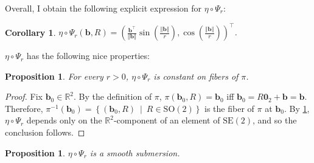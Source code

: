 \documentclass[a4paper,11pt]{scrartcl}
\newcounter{dummy}
\numberwithin{dummy}{section}
\theoremstyle{plain}
\newtheorem{proposition}[dummy]{Proposition}
\theoremstyle{plain}
\theoremstyle{plain}
\theoremstyle{plain}
\newtheorem{corollary}[dummy]{Corollary}
\theoremstyle{nonumberplain}
\newtheorem{proof}{Proof}
\newcommand{\F}[1][R]{\mathbb{#1}} %
\newcommand{\setsep}{\ \middle|\ } %
\newcommand{\Ltwonorm}[1]{\left\Vert #1 \right\Vert} %
\newcommand{\SE}{\mathrm{SE}}
\newcommand{\SO}{\mathrm{SO}}
\begin{document}
	Overall, I obtain the following explicit expression for $ \eta \circ \Psi_{r} $:
	\begin{corollary}
		\label{etaCompPsiFormula}
		$ \eta \circ \Psi_{r} \left(\mathbf{b}, R\right) 
		= \left( \frac{\mathbf{b}^{\top}}{\Ltwonorm{\mathbf{b}}} \sin \left(\frac{\Ltwonorm{\mathbf{b}}}{r}\right), \cos \left(\frac{\Ltwonorm{\mathbf{b}}}{r}\right) \right)^{\top} $.
	\end{corollary}
	
	$ \eta \circ \Psi_{r} $ has the following nice properties:
	\begin{proposition}
		\label{ConstantOnFibers}
		For every $ r > 0 $, $ \eta \circ \Psi_{r} $ is constant on fibers of $ \pi $.
	\end{proposition}
	
	\begin{proof}
		Fix $ \mathbf{b}_{0} \in \F^{2} $. By the definition of $ \pi $, $ \pi (\mathbf{b}_{0}, R) = \mathbf{b}_{0} $ iff $ \mathbf{b}_{0} = R \mathbf{0}_{2} + \mathbf{b} = \mathbf{b} $. Therefore, $ \pi^{-1} (\mathbf{b}_{0}) = \left\{ \left(\mathbf{b}_{0}, R\right) \setsep R \in \SO(2) \right\} $ is the fiber of $ \pi $ at $ \mathbf{b}_{0} $. By \cref{etaCompPsiFormula}, $ \eta \circ \Psi_{r} $ depends only on the $ \F^{2} $-component of an element of $ \SE(2) $, and so the conclusion follows.
	\end{proof}
	
	\begin{proposition}
		\label{etaCompPsiSubmersion}
		$ \eta \circ \Psi_{r} $ is a smooth submersion.
	\end{proposition}
	
\end{document}
